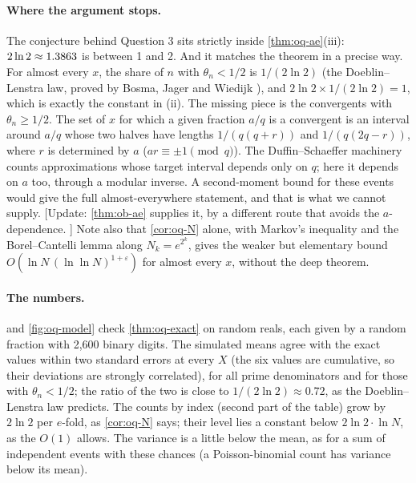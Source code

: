 \paragraph{Where the argument stops.} The conjecture behind Question 3 sits strictly inside \cref{thm:oq-ae}(iii): $2\ln 2 \approx 1.3863$ is between 1 and 2. And it matches the theorem in a precise way. For almost every $x$, the share of $n$ with $\theta_n < 1/2$ is $1/(2\ln 2)$ (the Doeblin--Lenstra law, proved by Bosma, Jager and Wiedijk \citep{BosmaJagerWiedijk1983}), and $2\ln 2 \times 1/(2\ln 2) = 1$, which is exactly the constant in (ii). The missing piece is the convergents with $\theta_n \ge 1/2$. The set of $x$ for which a given fraction $a/q$ is a convergent is an interval around $a/q$ whose two halves have lengths $1/(q(q+r))$ and $1/(q(2q - r))$, where $r$ is determined by $a$ ($ar \equiv \pm 1 \pmod q$). The Duffin--Schaeffer machinery counts approximations whose target interval depends only on $q$; here it depends on $a$ too, through a modular inverse. A second-moment bound for these events would give the full almost-everywhere statement, and that is what we cannot supply. [Update: \cref{thm:ob-ae} supplies it, by a different route that avoids the $a$-dependence. \addedon{\revB}] Note also that \cref{cor:oq-N} alone, with Markov's inequality and the Borel--Cantelli lemma along $N_k = e^{2^k}$, gives the weaker but elementary bound $O(\ln N\,(\ln\ln N)^{1+\varepsilon})$ for almost every $x$, without the deep theorem.

\paragraph{The numbers.}  and \cref{fig:oq-model} check \cref{thm:oq-exact} on \OqSimM{} random reals, each given by a random fraction with 2{,}600 binary digits. The simulated means agree with the exact values within two standard errors at every $X$ (the six values are cumulative, so their deviations are strongly correlated), for all prime denominators and for those with $\theta_n < 1/2$; the ratio of the two is close to $1/(2\ln 2) \approx 0.72$, as the Doeblin--Lenstra law predicts. The counts by index (second part of the table) grow by $2\ln 2$ per $e$-fold, as \cref{cor:oq-N} says; their level lies a constant below $2\ln 2 \cdot \ln N$, as the $O(1)$ allows. The variance is a little below the mean, as for a sum of independent events with these chances (a Poisson-binomial count has variance below its mean).

